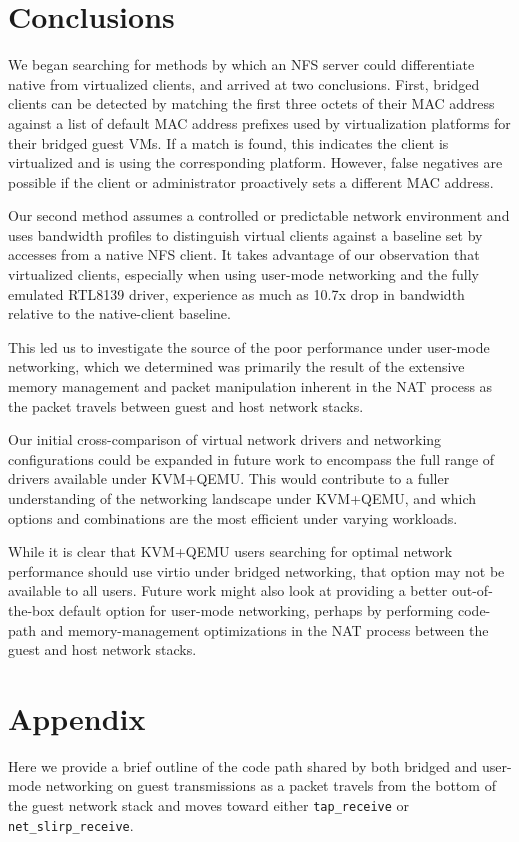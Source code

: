 \documentclass[letterpaper,twocolumn,11pt]{article}
\begin{document}
\section{Conclusions}
We began searching for methods by which an NFS server could differentiate native from virtualized clients, and arrived at two conclusions. First, bridged clients can be detected by matching the first three octets of their MAC address against a list of default MAC address prefixes used by virtualization platforms for their bridged guest VMs. If a match is found, this indicates the client is virtualized and is using the corresponding platform. However, false negatives are possible if the client or administrator proactively sets a different MAC address. 

Our second method assumes a controlled or predictable network environment and uses bandwidth profiles to distinguish virtual clients against a baseline set by accesses from a native NFS client. It takes advantage of our observation that virtualized clients, especially when using user-mode networking and the fully emulated RTL8139 driver, experience as much as 10.7x drop in bandwidth relative to the native-client baseline. 

This led us to investigate the source of the poor performance under user-mode networking, which we determined was primarily the result of the extensive memory management and packet manipulation inherent in the NAT process as the packet travels between guest and host network stacks.

Our initial cross-comparison of virtual network drivers and networking configurations could be expanded in future work to encompass the full range of drivers available under KVM+QEMU. This would contribute to a fuller understanding of the networking landscape under KVM+QEMU, and which options and combinations are the most efficient under varying workloads. 

While it is clear that KVM+QEMU users searching for optimal network performance should use virtio under bridged networking, that option may not be available to all users. Future work might also look at providing a better out-of-the-box default option for user-mode networking, perhaps by performing code-path and memory-management optimizations in the NAT process between the guest and host network stacks.

\section*{Appendix}
Here we provide a brief outline of the code path shared by both bridged and user-mode networking on guest transmissions as a packet travels from the bottom of the guest network stack and moves toward either \texttt{tap\_receive} or \texttt{net\_slirp\_receive}. 
\end{document}
